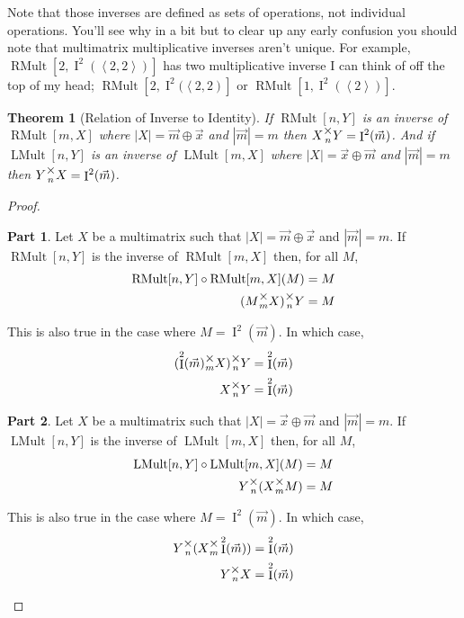\documentclass[12pt]{book}
\theoremstyle{plain}
\newtheorem{theorem}{Theorem}[chapter]
\theoremstyle{definition}
\theoremstyle{ppart}
\newtheorem{ppart}{Part}
\theoremstyle{case}
\theoremstyle{solution}
\DeclareMathOperator{\Ident}{I}
\DeclareMathOperator{\RMult}{RMult}
\DeclareMathOperator{\LMult}{LMult}
\newcommand{\mmult}[1]{\text{\raisebox{1ex}{$\underset{#1}{\times}$}}}
\newcommand{\shape}[1]{\left|#1\right|}
\begin{document}
Note that those inverses are defined as sets of operations, not individual operations. 
You'll see why in a bit but to clear up any early confusion you should note that multimatrix
multiplicative inverses aren't unique. For example, $\RMult[2,\Ident^2(\left<2,2\right>)]$ has
two multiplicative inverse I can think of off the top of my head;
$\RMult[2,\Ident^2(\left<2,2\right)]$ or
$\RMult[1,\Ident^2(\left<2\right>)]$.

\begin{theorem}[Relation of Inverse to Identity]
If $\RMult[n,Y]$ is an inverse of $\RMult[m,X]$ where $\shape{X} = \vec{m} \oplus \vec{x}$ and $\shape{\vec{m}} = m$
then $X \mmult{n} Y = \Ident^2(\vec{m})$.
And if $\LMult[n,Y]$ is an inverse of $\LMult[m,X]$ where $\shape{X} = \vec{x} \oplus \vec{m}$ and $\shape{\vec{m}} = m$
then $Y \mmult{n} X = \Ident^2(\vec{m})$.
\end{theorem}
\begin{proof}
\begin{ppart}
Let $X$ be a multimatrix such that $\shape{X} = \vec{m} \oplus \vec{x}$ and $\shape{\vec{m}} = m$.
If $\RMult[n,Y]$ is the inverse of $\RMult[m,X]$ then, for all $M$,
\begin{align*}
  \RMult[n,Y] \circ \RMult[m,X] (M) &= M \\
  (M \mmult{m} X) \mmult{n} Y &= M
\end{align*}

This is also true in the case where $M = \Ident^2(\vec{m})$. In which case,
\begin{align*}
  (\Ident^2(\vec{m}) \mmult{m} X) \mmult{n} Y &= \Ident^2(\vec{m}) \\
  X \mmult{n} Y &= \Ident^2(\vec{m}) \\
\end{align*}
\end{ppart}
\begin{ppart}
Let $X$ be a multimatrix such that $\shape{X} = \vec{x} \oplus \vec{m}$ and $\shape{\vec{m}} = m$.
If $\LMult[n,Y]$ is the inverse of $\LMult[m,X]$ then, for all $M$,
\begin{align*}
  \LMult[n,Y] \circ \LMult[m,X] (M) &= M \\
  Y \mmult{n} (X \mmult{m} M) &= M
\end{align*}

This is also true in the case where $M = \Ident^2(\vec{m})$. In which case,
\begin{align*}
  Y \mmult{n} (X \mmult{m} \Ident^2(\vec{m})) &= \Ident^2(\vec{m}) \\
  Y \mmult{n} X &= \Ident^2(\vec{m})
\end{align*}
\end{ppart}
\end{proof}
\end{document}
